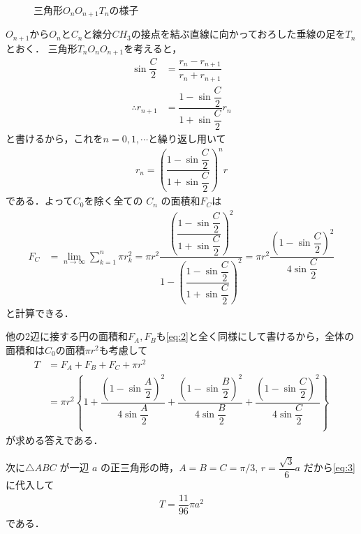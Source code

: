 \documentclass[../../main.tex]{subfiles}
\begin{document}
\begin{figure}[htb]
  \begin{center}
  \end{center}
  \caption{三角形$O_nO_{n+1}T_n$の様子}
\end{figure}

$O_{n+1}$から$O_n$と$C_n$と線分$CH_3$の接点を結ぶ直線に向かっておろした垂線の足を$T_n$とおく．
三角形$T_nO_nO_{n+1}$を考えると，
\begin{align}
  \sin \dfrac{C}{2} &= \dfrac{r_n - r_{n+1}}{r_n + r_{n+1}} \\
  \therefore
  r_{n+1} &= \dfrac{1 - \sin\dfrac{C}{2}}{1 + \sin\dfrac{C}{2}} r_n
\end{align}
と書けるから，これを$n=0,1,\cdots$と繰り返し用いて
\begin{align}
  r_n = \left(\dfrac{1 - \sin\dfrac{C}{2}}{1 + \sin\dfrac{C}{2}}\right)^n r \label{eq:1}
\end{align}
である．よって$C_0$を除く全ての $C_n$ の面積和$F_C$は
\begin{align}
  F_C
  &= \lim_{n \to \infty} \sum_{k=1}^n \pi r_k^2
  = \pi r^2 \dfrac{\left(\dfrac{1-\sin\dfrac{C}{2}}{1+\sin\dfrac{C}{2}}\right)^2}{1 - \left(\dfrac{1-\sin\dfrac{C}{2}}{1+\sin\dfrac{C}{2}}\right)^2}
  = \pi r^2 \dfrac{(1 - \sin\dfrac{C}{2})^2}{4 \sin\dfrac{C}{2}} \label{eq:2}
\end{align}
と計算できる．

他の2辺に接する円の面積和$F_A, F_B$も\cref{eq:2}と全く同様にして書けるから，全体の面積和は$C_0$の面積$\pi r^2$も考慮して
\begin{align}
  T
  &= F_A + F_B + F_C + \pi r^2 \\
  &= \pi r^2 \left\{ 1 + \dfrac{(1-\sin\dfrac{A}{2})^2}{4\sin\dfrac{A}{2}} + \dfrac{(1-\sin\dfrac{B}{2})^2}{4\sin\dfrac{B}{2}} + \dfrac{(1-\sin\dfrac{C}{2})^2}{4\sin\dfrac{C}{2}} \right\} \label{eq:3}
\end{align}
が求める答えである．

次に$\triangle ABC$ が一辺 $a$ の正三角形の時，$A=B=C=\pi/3$, $r = \dfrac{\sqrt{3}}{6} a$ だから\cref{eq:3}に代入して
\begin{align}
  T = \dfrac{11}{96} \pi a^2
\end{align}
である．
\end{document}
